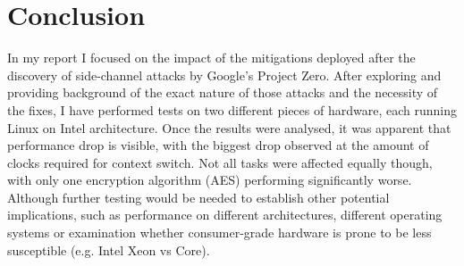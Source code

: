 \documentclass{csfourzero}
\begin{document}
\section{Conclusion}
\label{sec:conc}

In my report I focused on the impact of the mitigations deployed after the discovery of side-channel attacks by Google's Project Zero. After exploring and providing background of the exact nature of those attacks and the necessity of the fixes, I have performed tests on two different pieces of hardware, each running Linux on Intel architecture. Once the results were analysed, it was apparent that performance drop is visible, with the biggest drop observed at the amount of clocks required for context switch. Not all tasks were affected equally though, with only one encryption algorithm (AES) performing significantly worse. Although further testing would be needed to establish other potential implications, such as performance on different architectures, different operating systems or examination whether consumer-grade hardware is prone to be less susceptible (e.g. Intel Xeon vs Core). 


\end{document}
